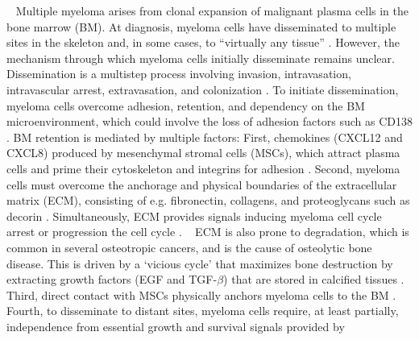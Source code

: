 \label{C1:introduction} %
\ %
Multiple myeloma arises from clonal expansion of malignant plasma cells in the
bone marrow (BM). At diagnosis, myeloma cells have disseminated to multiple
sites in the skeleton and, in some cases, to “virtually any tissue”
\cite{bladeExtramedullaryDiseaseMultiple2022,rajkumarInternationalMyelomaWorking2014}.
However, the mechanism through which myeloma cells initially disseminate remains
unclear. Dissemination is a multistep process involving invasion, intravasation,
intravascular arrest, extravasation, and colonization
\cite{zeissigTumourDisseminationMultiple2020}. To initiate dissemination,
myeloma cells overcome adhesion, retention, and dependency on the BM
microenvironment, which could involve the loss of adhesion factors such as CD138
\cite{akhmetzyanovaDynamicCD138Surface2020,garcia-ortizRoleTumorMicroenvironment2021}.
BM retention is mediated by multiple factors: First, chemokines (CXCL12 and
CXCL8) produced by mesenchymal stromal cells (MSCs), which attract plasma cells
and prime their cytoskeleton and integrins for adhesion
\cite{aggarwalChemokinesMultipleMyeloma2006,alsayedMechanismsRegulationCXCR42007}.
Second, myeloma cells must overcome the anchorage and physical boundaries of the
extracellular matrix (ECM), consisting of e.g. fibronectin, collagens, and
proteoglycans such as decorin
\cite{huDecorinmediatedSuppressionTumorigenesis2021,
    huangHigherDecorinLevels2015,katzAdhesionMoleculesLifelines2010,
    kiblerAdhesiveInteractionsHuman1998}. Simultaneously, ECM provides signals
inducing myeloma cell cycle arrest or progression the cell cycle
\cite{huDecorinmediatedSuppressionTumorigenesis2021,katzAdhesionMoleculesLifelines2010}.
\ %
ECM is also prone to degradation, which is common in several osteotropic
cancers, and is the cause of osteolytic bone disease. This is driven by a
‘vicious cycle' that maximizes bone destruction by extracting growth factors
(EGF and TGF-$\beta$) that are stored in calcified tissues
\cite{glaveyProteomicCharacterizationHuman2017}. Third, direct contact with MSCs
physically anchors myeloma cells to the BM
\cite{zeissigTumourDisseminationMultiple2020,sanz-rodriguezCharacterizationVLA4dependentMyeloma1999}.
Fourth, to disseminate to distant sites, myeloma cells require, at least
partially, independence from essential growth and survival signals provided by
